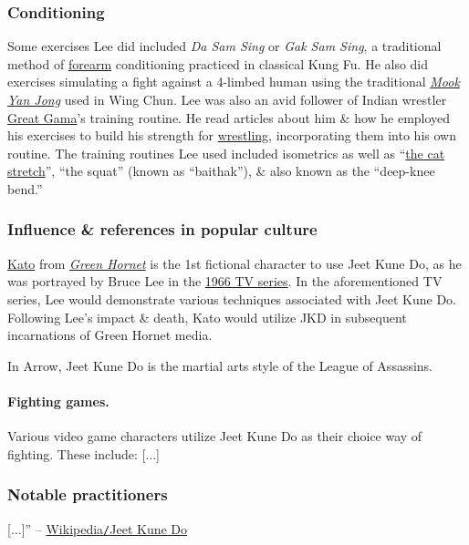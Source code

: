 \documentclass{article}
\begin{document}
\subsubsection{Conditioning}
Some exercises {\sc Lee} did included {\it Da Sam Sing} or {\it Gak Sam Sing}, a traditional method of \href{https://en.wikipedia.org/wiki/Forearm}{forearm} conditioning practiced in classical Kung Fu. He also did exercises simulating a fight against a 4-limbed human using the traditional \href{https://en.wikipedia.org/wiki/Mu_ren_zhuang}{\it Mook Yan Jong} used in Wing Chun. {\sc Lee} was also an avid follower of Indian wrestler \href{https://en.wikipedia.org/wiki/Great_Gama}{Great Gama}'s training routine. He read articles about him \& how he employed his exercises to build his strength for \href{https://en.wikipedia.org/wiki/Wrestling}{wrestling}, incorporating them into his own routine. The training routines {\sc Lee} used included isometrics as well as ``\href{https://en.wikipedia.org/wiki/Push-up}{the cat stretch}'', ``the squat'' (known as ``baithak''), \& also known as the ``deep-knee bend.''

\subsubsection{Influence \& references in popular culture}
\href{https://en.wikipedia.org/wiki/Kato_(The_Green_Hornet)}{\sf Kato} from \href{https://en.wikipedia.org/wiki/Green_Hornet}{\it Green Hornet} is the 1st fictional character to use Jeet Kune Do, as he was portrayed by {\sc Bruce Lee} in the \href{https://en.wikipedia.org/wiki/The_Green_Hornet_(TV_series)}{1966 TV series}. In the aforementioned TV series, {\sc Lee} would demonstrate various techniques associated with Jeet Kune Do. Following {\sc Lee}'s impact \& death, Kato would utilize JKD in subsequent incarnations of Green Hornet media.

In Arrow, Jeet Kune Do is the martial arts style of the League of Assassins.

\paragraph{Fighting games.} Various video game characters utilize Jeet Kune Do as their choice way of fighting. These include: [$\ldots$]

\subsubsection{Notable practitioners}
[$\ldots$]'' -- \href{https://en.wikipedia.org/wiki/Jeet_Kune_Do}{Wikipedia{\tt/}Jeet Kune Do}
\end{document}
